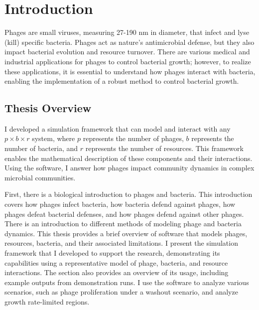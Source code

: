 \chapter{Introduction}
\label{Introduction}
Phages are small viruses, measuring 27-190 nm in diameter, that infect and lyse (kill) specific bacteria. 
Phages act as nature’s antimicrobial defense, but they also impact bacterial evolution and resource turnover. 
There are various medical and industrial applications for phages to control bacterial growth; however, to realize these applications, it is essential to understand how phages interact with bacteria, enabling the implementation of a robust method to control bacterial growth. 

\section{Thesis Overview}
I developed a simulation framework that can model and interact with any $p\times b\times r$ system, where $p$ represents the number of phages, $b$ represents the number of bacteria, and $r$ represents the number of resources. 
This framework enables the mathematical description of these components and their interactions. 
Using the software, I answer how phages impact community dynamics in complex microbial communities. 

First, there is a biological introduction to phages and bacteria. 
This introduction covers how phages infect bacteria, how bacteria defend against phages, how phages defeat bacterial defenses, and how phages defend against other phages. 
There is an introduction to different methods of modeling phage and bacteria dynamics. 
This thesis provides a brief overview of software that models phages, resources, bacteria, and their associated limitations. 
I present the simulation framework that I developed to support the research, demonstrating its capabilities using a representative model of phage, bacteria, and resource interactions. 
The section also provides an overview of its usage, including example outputs from demonstration runs.
I use the software to analyze various scenarios, such as phage proliferation under a washout scenario, and analyze growth rate-limited regions. 

